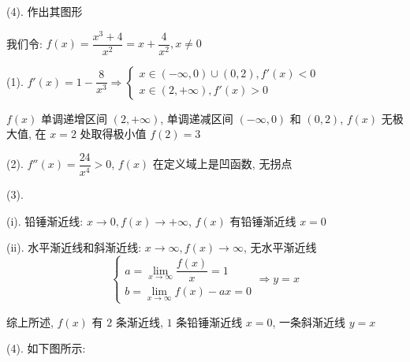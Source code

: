 (4). 作出其图形
\begin{solution}

	我们令: $f(x) = \dfrac{x^{3}+4}{x^{2}} = x+\dfrac{4}{x^{2}},x\neq 0$

	(1). $f'(x) = 1-\dfrac{8}{x^{3}}\Rightarrow 
	\begin{cases}
	x\in(-\infty,0)\cup (0,2), f'(x) < 0\\
	x\in(2,+\infty), f'(x) > 0
	\end{cases}$

	$f(x)$ 单调递增区间 $(2,+\infty)$, 单调递减区间 $(-\infty,0)$ 和 $(0,2)$, $f(x)$ 无极大值, 在 $x=2$ 处取得极小值 $f(2) = 3$

	(2). $f''(x) = \dfrac{24}{x^{4}} > 0$, $f(x)$ 在定义域上是凹函数, 无拐点

	(3). 
	
	(i). 铅锤渐近线: $x\to 0, f(x)\to +\infty$, $f(x)$ 有铅锤渐近线 $x=0$

	(ii). 水平渐近线和斜渐近线: $x\to \infty, f(x)\to \infty$, 无水平渐近线
	$$\begin{cases}
	a = \lim\limits_{x\to \infty} \dfrac{f(x)}{x} =1\\
	b = \lim\limits_{x\to \infty} f(x)-ax = 0
	\end{cases}\Rightarrow y = x$$

	综上所述, $f(x)$ 有 $2$ 条渐近线, $1$ 条铅锤渐近线 $x=0$, 一条斜渐近线 $y = x$

	(4). 如下图所示:

\end{solution}

